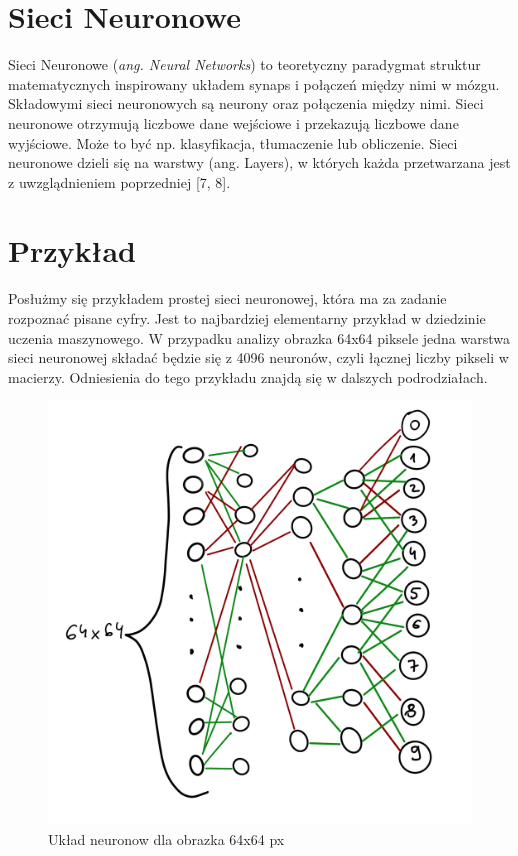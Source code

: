 \documentclass[openright]{xmgr}
\begin{document}
\section{Sieci Neuronowe   \label{s:dsssl}}

\indent \indent Sieci Neuronowe (\textit{ang. Neural Networks}) to teoretyczny paradygmat struktur matematycznych inspirowany układem synaps i połączeń między nimi w mózgu. Składowymi sieci neuronowych są neurony oraz połączenia między nimi. Sieci neuronowe otrzymują liczbowe dane wejściowe i przekazują liczbowe dane wyjściowe. Może to być np. klasyfikacja, tłumaczenie lub obliczenie. Sieci neuronowe dzieli się na warstwy (ang. Layers), w których każda przetwarzana jest z uwzglądnieniem poprzedniej [7, 8].



\section{Przykład  \label{s:dsssl}}

\indent \indent Posłużmy się przykładem prostej sieci neuronowej, która ma za zadanie rozpoznać pisane cyfry. Jest to najbardziej elementarny przykład w dziedzinie uczenia maszynowego.
W przypadku analizy obrazka 64x64 piksele jedna warstwa sieci neuronowej składać będzie się z 4096 neuronów, czyli łącznej liczby pikseli w macierzy. Odniesienia do tego przykładu znajdą się w dalszych podrodziałach.

\begin{figure}[!tbh]
\centering
\includegraphics[width=.8\hsize]{fig/2}
\caption{Układ neuronow dla obrazka 64x64 px\label{RYS.2}}
\end{figure}
\end{document}
